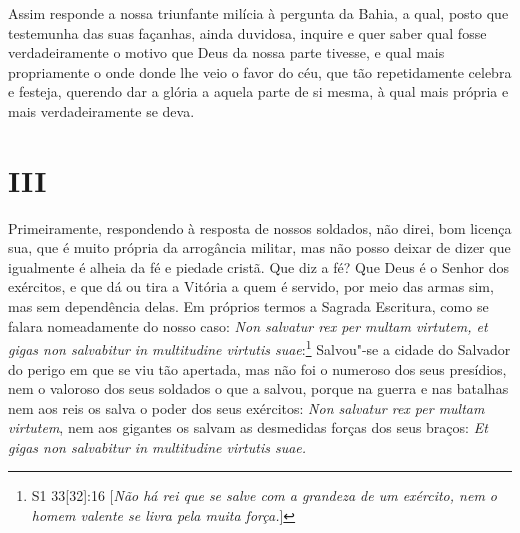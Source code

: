 Assim responde a nossa triunfante milícia à pergunta da Bahia, a qual,
posto que testemunha das suas façanhas, ainda duvidosa, inquire e quer
saber qual fosse verdadeiramente o motivo que Deus da nossa parte
tivesse, e qual mais propriamente o onde donde lhe veio o favor do céu,
que tão repetidamente celebra e festeja, querendo dar a glória a aquela
parte de si mesma, à qual mais própria e mais verdadeiramente se deva.

\section{III}

Primeiramente, respondendo à resposta de nossos soldados, não direi, bom
licença sua, que é muito própria da arrogância militar, mas não posso
deixar de dizer que igualmente é alheia da fé e piedade cristã. Que diz
a fé? Que Deus é o Senhor dos exércitos, e que dá ou tira a Vitória a
quem é servido, por meio das armas sim, mas sem dependência delas. Em
próprios termos a Sagrada Escritura, como se falara nomeadamente do
nosso caso: \emph{Non salvatur rex per multam virtutem, et gigas non
salvabitur in multitudine virtutis suae}:\footnote{S1 33[32]:16 [\textit{Não há rei que se salve com a grandeza de um exército, nem o homem valente se livra pela muita força.}]} Salvou"-se a
cidade do Salvador do perigo em que se viu tão apertada, mas não foi o
numeroso dos seus presídios, nem o valoroso dos seus soldados o que a
salvou, porque na guerra e nas batalhas nem aos reis os salva o poder
dos seus exércitos: \emph{Non salvatur rex per multam virtutem}, nem
aos gigantes os salvam as desmedidas forças dos seus braços: \emph{Et
gigas non salvabitur in multitudine virtutis suae.}

